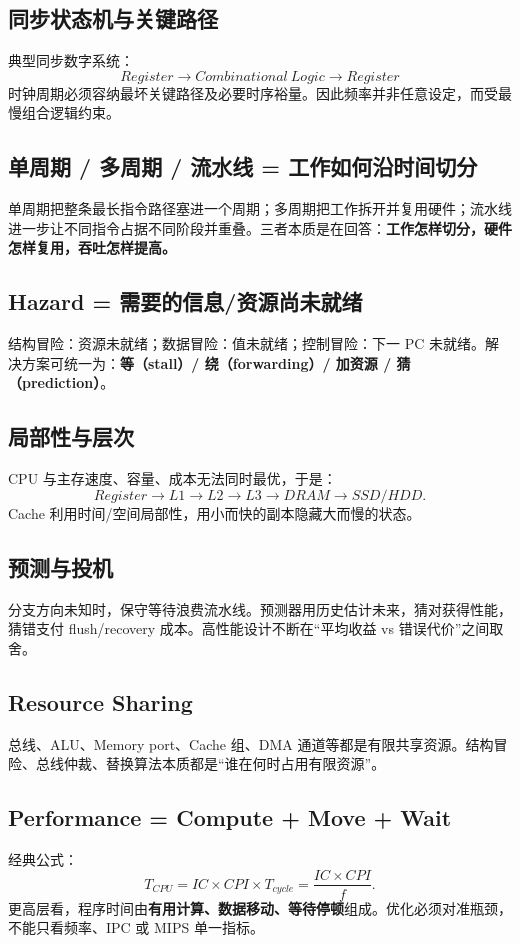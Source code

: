 \documentclass[11pt,a4paper,openany]{ctexbook}
\newcommand{\key}[1]{\textbf{\color{deep}#1}}
\begin{document}
\subsection{同步状态机与关键路径}
典型同步数字系统：
\[
\boxed{Register\rightarrow Combinational\ Logic\rightarrow Register}
\]
时钟周期必须容纳最坏关键路径及必要时序裕量。因此频率并非任意设定，而受最慢组合逻辑约束。

\subsection{单周期 / 多周期 / 流水线 = 工作如何沿时间切分}
单周期把整条最长指令路径塞进一个周期；多周期把工作拆开并复用硬件；流水线进一步让不同指令占据不同阶段并重叠。三者本质是在回答：\key{工作怎样切分，硬件怎样复用，吞吐怎样提高。}

\subsection{Hazard = 需要的信息/资源尚未就绪}
结构冒险：资源未就绪；数据冒险：值未就绪；控制冒险：下一 PC 未就绪。解决方案可统一为：\key{等（stall）/ 绕（forwarding）/ 加资源 / 猜（prediction）}。

\subsection{局部性与层次}
CPU 与主存速度、容量、成本无法同时最优，于是：
\[
Register\rightarrow L1\rightarrow L2\rightarrow L3\rightarrow DRAM\rightarrow SSD/HDD.
\]
Cache 利用时间/空间局部性，用小而快的副本隐藏大而慢的状态。

\subsection{预测与投机}
分支方向未知时，保守等待浪费流水线。预测器用历史估计未来，猜对获得性能，猜错支付 flush/recovery 成本。高性能设计不断在“平均收益 vs 错误代价”之间取舍。

\subsection{Resource Sharing}
总线、ALU、Memory port、Cache 组、DMA 通道等都是有限共享资源。结构冒险、总线仲裁、替换算法本质都是“谁在何时占用有限资源”。

\subsection{Performance = Compute + Move + Wait}
经典公式：
\[
T_{CPU}=IC\times CPI\times T_{cycle}=\frac{IC\times CPI}{f}.
\]
更高层看，程序时间由\key{有用计算、数据移动、等待停顿}组成。优化必须对准瓶颈，不能只看频率、IPC 或 MIPS 单一指标。
\end{document}
